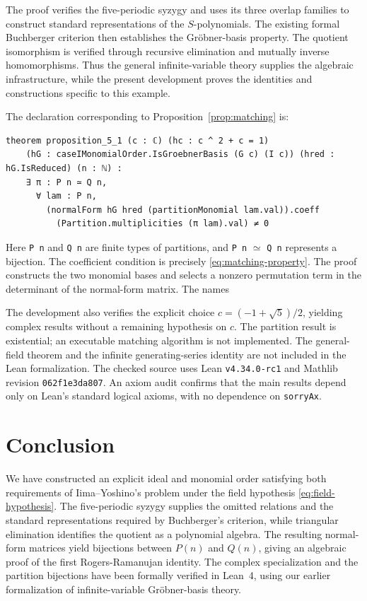 \documentclass[11pt,reqno]{amsart}
\theoremstyle{definition}
\theoremstyle{remark}
\theoremstyle{plain}
\begin{document}
The proof verifies the five-periodic syzygy and uses its three
overlap families to construct standard representations of the
\(S\)-polynomials.  The existing formal Buchberger criterion then
establishes the Gr\"obner-basis property.  The quotient isomorphism
is verified through recursive elimination and mutually inverse
homomorphisms.  Thus the general infinite-variable theory supplies
the algebraic infrastructure, while the present development proves
the identities and constructions specific to this example.

The declaration corresponding to Proposition~\ref{prop:matching} is:
\begin{lstlisting}
theorem proposition_5_1 (c : ℂ) (hc : c ^ 2 + c = 1)
    (hG : caseIMonomialOrder.IsGroebnerBasis (G c) (I c)) (hred : hG.IsReduced) (n : ℕ) :
    ∃ π : P n ≃ Q n,
      ∀ lam : P n,
        (normalForm hG hred (partitionMonomial lam.val)).coeff
          (Partition.multiplicities (π lam).val) ≠ 0
\end{lstlisting}
Here \texttt{P n} and \texttt{Q n} are finite types of partitions,
and \texttt{P n} $\simeq$ \texttt{Q n} represents a bijection.  The coefficient
condition is precisely \eqref{eq:matching-property}.  The proof
constructs the two monomial bases and selects a nonzero permutation
 term in the determinant of the normal-form matrix.  
The names

The development also verifies the explicit choice
\(c=(-1+\sqrt5)/2\), yielding complex results without a remaining
hypothesis on \(c\).  The partition result is existential; an
executable matching algorithm is not implemented.  The general-field
theorem and the infinite generating-series identity are not included
in the Lean formalization.  The checked source uses Lean
\texttt{v4.34.0-rc1} and Mathlib revision \texttt{062f1e3da807}.
An axiom audit confirms that the main results depend only on Lean's
standard logical axioms, with no dependence on \texttt{sorryAx}.



\section{Conclusion}\label{sec:conclusion}

We have constructed an explicit ideal and monomial order satisfying
both requirements of Iima--Yoshino's problem under the field hypothesis
\eqref{eq:field-hypothesis}.  The five-periodic syzygy supplies the
omitted relations and the standard representations required by
Buchberger's criterion, while triangular elimination identifies the
quotient as a polynomial algebra.  The resulting normal-form matrices
yield bijections between \(P(n)\) and \(Q(n)\), giving an algebraic
proof of the first Rogers-Ramanujan identity.  The complex
specialization and the partition bijections have been formally
verified in Lean~4, using our earlier formalization of
infinite-variable Gr\"obner-basis theory.
\end{document}
